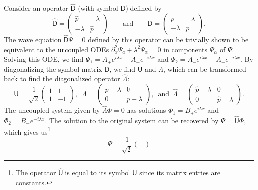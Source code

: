 \begin{example}
Consider an operator $\widehat{\mathsf{D}}$ (with symbol $\mathsf{D}$) defined by
%
\begin{equation}
  \widehat{\mathsf{D}} =
  \begin{pmatrix}
    \hat{p} & -\lambda\\
    -\lambda & \hat{p}
  \end{pmatrix}
  \qquad\text{and}\qquad
  \mathsf{D} =
  \begin{pmatrix}
    p & -\lambda\\
    -\lambda & p
  \end{pmatrix}.
\end{equation}
%
The wave equation $\widehat{\mathsf{D}}\Psi = 0$ defined by this operator can be trivially shown to be equivalent to the uncoupled ODEs $\partial_{x}^{2}\Psi_{a} + \lambda^{2}\Psi_{\alpha} = 0$ in components $\Psi_{\alpha}$ of $\Psi$.
Solving this ODE, we find $\Psi_{1} = A_{+}e^{i \lambda x} + A_{-}e^{-i\lambda x}$ and $\Psi_{2} = A_{+}e^{i \lambda x} - A_{-}e^{-i\lambda x}$.
%
By diagonalizing the symbol matrix $\mathsf{D}$, we find $\mathsf{U}$ and $\Lambda$, which can be transformed back to find the diagonalized operator $\widehat{\Lambda}$:
%
\begin{equation}
  \mathsf{U} = \frac{1}{\sqrt{2}}
  \begin{pmatrix}
    1 & 1\\
    1 & -1
  \end{pmatrix},\enspace
  \Lambda =
  \begin{pmatrix}
    p - \lambda & 0\\
    0 & p + \lambda
  \end{pmatrix},\enspace
  \text{and}\enspace
  \widehat{\Lambda} =
  \begin{pmatrix}
    \hat{p} - \lambda & 0\\
    0 & \hat{p} + \lambda
  \end{pmatrix}.
\end{equation}
%
The uncoupled system given by $\widehat{\Lambda}\Phi = 0 $ has solutions $\Phi_{1} = B_{+}e^{i\lambda x}$ and $\Phi_{2} = B_{-}e^{-i\lambda x}$.
The solution to the original system can be recovered by $\Psi = \widehat{\mathsf{U}}\Phi$, which gives us\footnote{The operator $\widehat{\mathsf{U}}$ is equal to its symbol $\mathsf{U}$ since its matrix entries are constants.}
%
\begin{equation}
  \Psi = \frac{1}{\sqrt{2}}
  \begin{pmatrix}

\end{pmatrix}
\end{equation}
\end{example}

